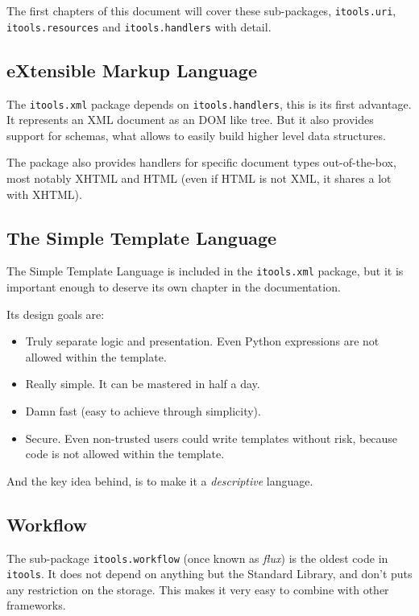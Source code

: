 The first chapters of this document will cover these sub-packages,
{\tt itools.uri}, {\tt itools.resources} and {\tt itools.handlers} with
detail.

\subsection{eXtensible Markup Language}

The {\tt itools.xml} package depends on {\tt itools.handlers}, this is its
first advantage. It represents an XML document as an DOM like tree. But it
also provides support for schemas, what allows to easily build higher
level data structures.

The package also provides handlers for specific document types out-of-the-box,
most notably XHTML and HTML (even if HTML is not XML, it shares a lot with
XHTML).


\subsection{The Simple Template Language}

The Simple Template Language is included in the {\tt itools.xml} package,
but it is important enough to deserve its own chapter in the documentation.

Its design goals are:

\begin{itemize}
  \item Truly separate logic and presentation. Even Python expressions are
    not allowed within the template.

  \item Really simple. It can be mastered in half a day.

  \item Damn fast (easy to achieve through simplicity).

  \item Secure. Even non-trusted users could write templates without risk,
    because code is not allowed within the template.
\end{itemize}

And the key idea behind, is to make it a {\em descriptive} language.


\subsection{Workflow}

The sub-package {\tt itools.workflow} (once known as {\em flux}) is the
oldest code in {\tt itools}. It does not depend on anything but the
Standard Library, and don't puts any restriction on the storage. This
makes it very easy to combine with other frameworks.

